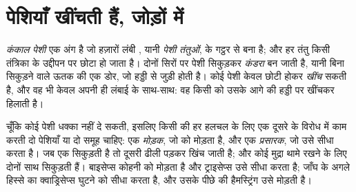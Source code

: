 \section{पेशियाँ खींचती हैं, जोड़ों में}

\begin{definition}[कंकाल पेशी और कंडरा]\label{def:g10:muscles-and-joints:muscle}
\emph{कंकाल पेशी} एक अंग है जो हज़ारों लंबी ,
यानी \emph{पेशी तंतुओं}, के गट्ठर से बना है; और हर तंतु किसी तंत्रिका के
उद्दीपन पर छोटा हो जाता है। दोनों सिरों पर पेशी सिकुड़कर
\emph{कंडरा} बन जाती है, यानी बिना सिकुड़ने वाले ऊतक की एक
डोर, जो हड्डी से जुड़ी होती है। कोई पेशी केवल छोटी होकर \emph{खींच} सकती
है, और वह भी केवल अपनी ही लंबाई के साथ-साथ: वह किसी  को उसके आगे की
हड्डी पर खींचकर हिलाती है।
\end{definition}

\begin{proposition}[विरोधी जोड़े]\label{prop:g10:muscles-and-joints:antagonists}
चूँकि कोई पेशी धक्का नहीं दे सकती, इसलिए किसी  की हर हलचल के लिए एक
दूसरे के विरोध में काम करती दो पेशियाँ या दो समूह चाहिए: एक \emph{मोड़क},
जो  को मोड़ता है, और एक \emph{प्रसारक}, जो उसे सीधा करता है। जब एक
सिकुड़ती है तो दूसरी ढीली पड़कर खिंच जाती है; और कोई मुद्रा थामे रखने के
लिए दोनों साथ सिकुड़ती हैं। बाइसेप्स कोहनी को मोड़ता है और ट्राइसेप्स उसे
सीधा करता है; जाँघ के अगले हिस्से का क्वाड्रिसेप्स घुटने को सीधा करता है,
और उसके पीछे की हैमस्ट्रिंग उसे मोड़ती है।
\end{proposition}
\admitted

